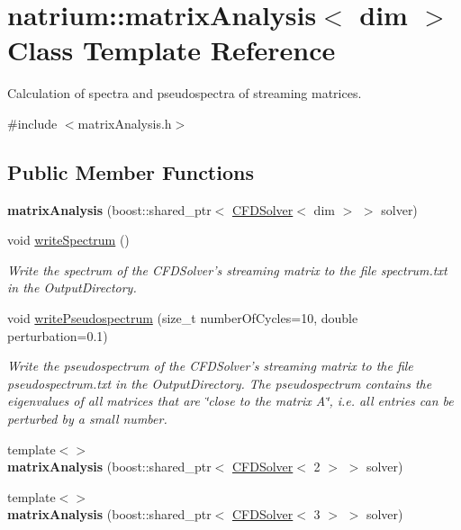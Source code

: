 \hypertarget{classnatrium_1_1matrixAnalysis}{
\section{natrium::matrixAnalysis$<$ dim $>$ Class Template Reference}
\label{classnatrium_1_1matrixAnalysis}
}


Calculation of spectra and pseudospectra of streaming matrices.  


{\ttfamily \#include $<$matrixAnalysis.h$>$}\subsection*{Public Member Functions}
\begin{DoxyCompactItemize}
\item 
\hypertarget{classnatrium_1_1matrixAnalysis_a2adce3a150d6a284ade9dfb4474f1c95}{
{\bfseries matrixAnalysis} (boost::shared\_\-ptr$<$ \hyperlink{classnatrium_1_1CFDSolver}{CFDSolver}$<$ dim $>$ $>$ solver)}
\label{classnatrium_1_1matrixAnalysis_a2adce3a150d6a284ade9dfb4474f1c95}

\item 
void \hyperlink{classnatrium_1_1matrixAnalysis_af83535a0c1c83db223649b958c245df1}{writeSpectrum} ()
\begin{DoxyCompactList}\small\item\em Write the spectrum of the CFDSolver's streaming matrix to the file spectrum.txt in the OutputDirectory. \item\end{DoxyCompactList}\item 
void \hyperlink{classnatrium_1_1matrixAnalysis_a2c18eb04461c90bfdf3f301e8c9dfc1b}{writePseudospectrum} (size\_\-t numberOfCycles=10, double perturbation=0.1)
\begin{DoxyCompactList}\small\item\em Write the pseudospectrum of the CFDSolver's streaming matrix to the file pseudospectrum.txt in the OutputDirectory. The pseudospectrum contains the eigenvalues of all matrices that are \char`\"{}close to the matrix A\char`\"{}, i.e. all entries can be perturbed by a small number. \item\end{DoxyCompactList}\item 
\hypertarget{classnatrium_1_1matrixAnalysis_a1ff55d84b26542fd69daecd377e97b73}{
{\footnotesize template$<$$>$ }\\{\bfseries matrixAnalysis} (boost::shared\_\-ptr$<$ \hyperlink{classnatrium_1_1CFDSolver}{CFDSolver}$<$ 2 $>$ $>$ solver)}
\label{classnatrium_1_1matrixAnalysis_a1ff55d84b26542fd69daecd377e97b73}

\item 
\hypertarget{classnatrium_1_1matrixAnalysis_abdfe6261017b6fc18bb6abe9c89d24d6}{
{\footnotesize template$<$$>$ }\\{\bfseries matrixAnalysis} (boost::shared\_\-ptr$<$ \hyperlink{classnatrium_1_1CFDSolver}{CFDSolver}$<$ 3 $>$ $>$ solver)}
\label{classnatrium_1_1matrixAnalysis_abdfe6261017b6fc18bb6abe9c89d24d6}

\end{DoxyCompactItemize}
